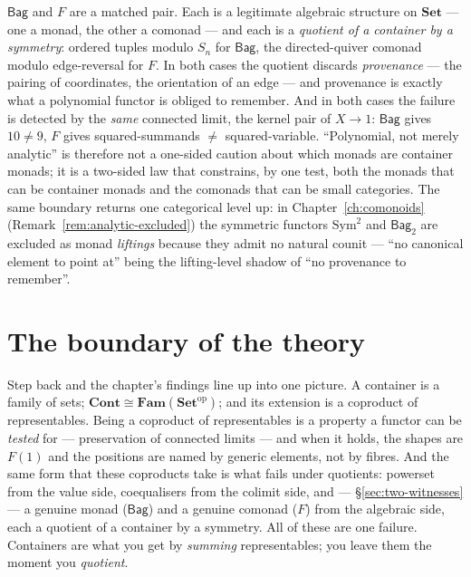 \documentclass[11pt,a4paper]{book}
\newcommand{\Set}{\mathbf{Set}}
\newcommand{\Cont}{\mathbf{Cont}}
\newcommand{\Fam}{\mathbf{Fam}}
\newcommand{\op}{^{\mathrm{op}}}
\theoremstyle{plain}
\theoremstyle{definition}
\theoremstyle{remark}
\begin{document}
\begin{teachbox}
$\mathsf{Bag}$ and $F$ are a matched pair. Each is a legitimate algebraic structure on
$\Set$ --- one a monad, the other a comonad --- and each is a \emph{quotient of a container
by a symmetry}: ordered tuples modulo $S_{n}$ for $\mathsf{Bag}$, the directed-quiver comonad
modulo edge-reversal for $F$. In both cases the quotient discards \emph{provenance} --- the
pairing of coordinates, the orientation of an edge --- and provenance is exactly what a
polynomial functor is obliged to remember. And in both cases the failure is detected by the
\emph{same} connected limit, the kernel pair of $X\to 1$: $\mathsf{Bag}$ gives $10\neq 9$,
$F$ gives squared-summands $\neq$ squared-variable. ``Polynomial, not merely analytic'' is
therefore not a one-sided caution about which monads are container monads; it is a two-sided
law that constrains, by one test, both the monads that can be container monads and the
comonads that can be small categories. The same boundary returns one categorical level up:
in Chapter~\ref{ch:comonoids} (Remark~\ref{rem:analytic-excluded}) the symmetric functors
$\mathrm{Sym}^{2}$ and $\mathsf{Bag}_{2}$ are excluded as monad \emph{liftings} because they
admit no natural counit --- ``no canonical element to point at'' being the lifting-level
shadow of ``no provenance to remember''.
\end{teachbox}

\section{The boundary of the theory}
\label{sec:boundary}

Step back and the chapter's findings line up into one picture. A container is a
family of sets; $\Cont\cong\Fam(\Set\op)$; and its extension is a coproduct of
representables. Being a coproduct of representables is a property a functor can be
\emph{tested} for --- preservation of connected limits --- and when it holds, the
shapes are $F(1)$ and the positions are named by generic elements, not by fibres.
And the same form that these coproducts take is what fails under quotients: powerset
from the value side, coequalisers from the colimit side, and --- \S\ref{sec:two-witnesses} ---
a genuine monad ($\mathsf{Bag}$) and a genuine comonad ($F$) from the algebraic side,
each a quotient of a container by a symmetry. All of these are one
failure. Containers are what you get by \emph{summing} representables; you leave them
the moment you \emph{quotient}.
\end{document}
